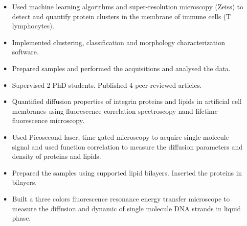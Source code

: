 \documentclass[10pt,a4paper,ragged2e,withhyper]{altacv}
\begin{document}
\begin{paracol}{2}
\begin{itemize}

	   		        
	   		        \item Used machine learning algorithms and super-resolution microscopy (Zeiss) to detect and quantify protein clusters in the membrane of immune cells (T lymphocytes).
	   		        \item Implemented  clustering, classification and morphology characterization software.
	   		        \item Prepared samples and performed the acquisitions and analysed the data.
	   		        
	   		        \item Supervised 2 PhD students. Published 4 peer-reviewed articles.
                
            \end{itemize}
            \divider
            
            \begin{itemize}
                \item Quantified diffusion properties of integrin proteins and lipids in artificial cell membranes using fluorescence correlation spectroscopy nand lifetime fluorescence microscopy.
                \item Used Picosecond laser, time-gated microscopy to acquire single molecule signal and used function correlation to measure the diffusion parameters and density of proteins and lipids.
                \item Prepared the samples using supported lipid bilayers. Inserted the proteins in bilayers.
                
             \end{itemize}            
             \divider 
             
            \begin{itemize}
                \item Built a three colors fluorescence resonance energy transfer microscope to measure the diffusion and dynamic of single molecule DNA strands in liquid phase.     
            \end{itemize}
        


\end{paracol}
\end{document}
